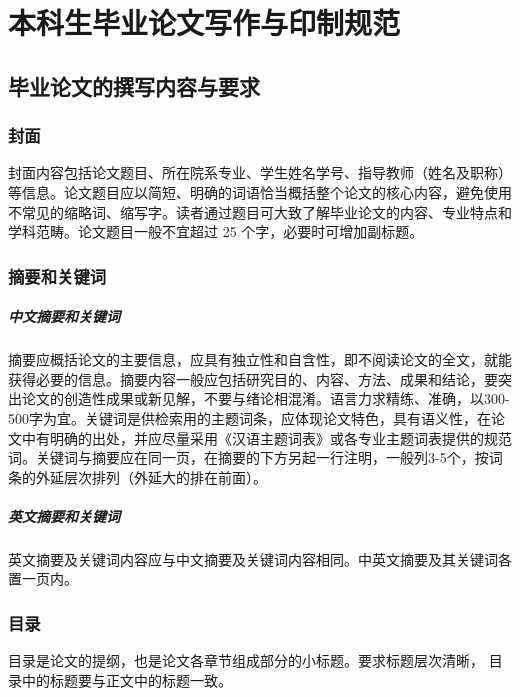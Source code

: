 
\chapter{本科生毕业论文写作与印制规范}

\section{毕业论文的撰写内容与要求}

\subsection{封面}

封面内容包括论文题目、所在院系专业、学生姓名学号、指导教师（姓名及职称）等信息。论文题目应以简短、明确的词语恰当概括整个论文的核心内容，避免使用不常见的缩略词、缩写字。读者通过题目可大致了解毕业论文的内容、专业特点和学科范畴。论文题目一般不宜超过 25 个字，必要时可增加副标题。

\subsection{摘要和关键词}

\paragraph{中文摘要和关键词}

摘要应概括论文的主要信息，应具有独立性和自含性，即不阅读论文的全文，就能获得必要的信息。摘要内容一般应包括研究目的、内容、方法、成果和结论，要突出论文的创造性成果或新见解，不要与绪论相混淆。语言力求精练、准确，以300-500字为宜。关键词是供检索用的主题词条，应体现论文特色，具有语义性，在论文中有明确的出处，并应尽量采用《汉语主题词表》或各专业主题词表提供的规范词。关键词与摘要应在同一页，在摘要的下方另起一行注明，一般列3-5个，按词条的外延层次排列（外延大的排在前面）。

\paragraph{英文摘要和关键词}

英文摘要及关键词内容应与中文摘要及关键词内容相同。中英文摘要及其关键词各置一页内。

\subsection{目录}

目录是论文的提纲，也是论文各章节组成部分的小标题。要求标题层次清晰，
目录中的标题要与正文中的标题一致。

